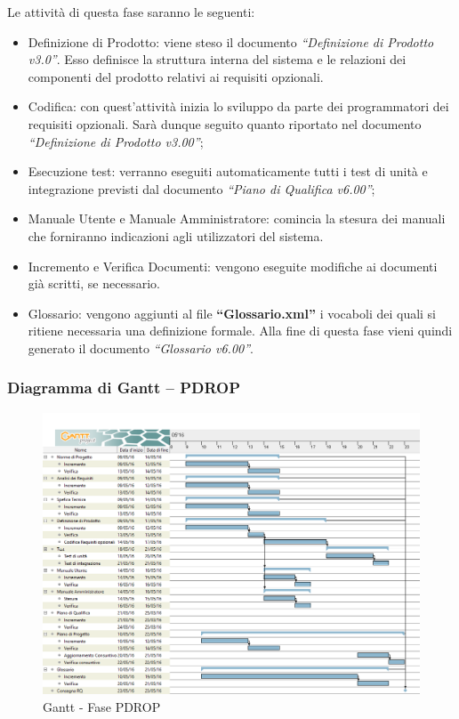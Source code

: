 \documentclass[../PianoProgetto.tex]{subfiles}
\begin{document}
		Le attività di questa fase saranno le seguenti:
		\begin{itemize}
			\item Definizione di Prodotto: viene steso il documento \textit{“Definizione di Prodotto v3.0”}. Esso definisce la struttura interna del sistema e le relazioni dei componenti del prodotto relativi ai requisiti opzionali.

			\item Codifica: con quest’attività inizia lo sviluppo da parte dei programmatori dei requisiti opzionali. Sarà dunque seguito quanto riportato nel documento \textit{“Definizione di Prodotto v3.00”};

			\item Esecuzione test: verranno eseguiti automaticamente tutti i test di unità e integrazione previsti dal documento \textit{“Piano di Qualifica v6.00”};

			\item Manuale Utente e Manuale Amministratore: comincia la stesura dei manuali che forniranno indicazioni agli utilizzatori del sistema.

			\item Incremento e Verifica Documenti: vengono eseguite modifiche ai documenti già scritti, se necessario.
			
			\item Glossario: vengono aggiunti al file \textbf{“Glossario.xml”} i vocaboli dei quali si ritiene necessaria una definizione formale. Alla fine di questa fase vieni quindi generato il documento \textit{“Glossario v6.00”}.
		\end{itemize}
		
\newpage		
		
		\subsubsection{Diagramma di Gantt – PDROP}
			\begin{figure}[!h]
				\centering
				\includegraphics[width=\textwidth]{gantt_png/6-requisiti_facoltativi}
				\caption{Gantt - Fase PDROP}
				\label{fig:Gantt - Fase PDROP}
			\end{figure}
			
\end{document}
